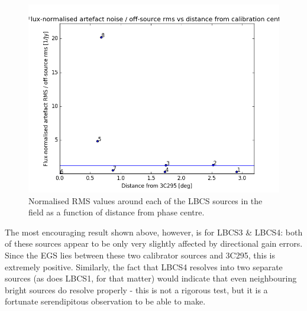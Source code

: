 \begin{figure}[h!]
\includegraphics[width=0.8\linewidth]{images/NormArtefactRMSvsDistFrom3c295.png}
\caption{Normalised RMS values around each of the LBCS sources in the field as a function of distance from phase centre. }
\label{fig.rmsratio.distEGS}
\end{figure}

\pg
The most encouraging result shown above, however, is for LBCS3 \& LBCS4: both of these sources appear to be only very slightly affected by directional gain errors. Since the EGS lies between these two calibrator sources and 3C295, this is extremely positive. Similarly, the fact that LBCS4 resolves into two separate sources (as does LBCS1, for that matter) would indicate that even neighbouring bright sources do resolve properly - this is not a rigorous test, but it is a fortunate serendipitous observation to be able to make.


%



